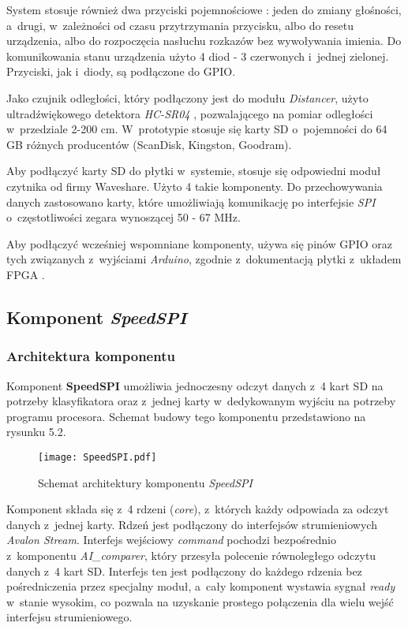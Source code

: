 System stosuje również dwa przyciski pojemnościowe \cite{Button}: jeden do zmiany głośności, a~drugi, w~zależności od czasu przytrzymania przycisku, albo do resetu urządzenia, albo do rozpoczęcia nasłuchu rozkazów bez wywoływania imienia. Do komunikowania stanu urządzenia użyto 4 diod - 3 czerwonych i~jednej zielonej. Przyciski, jak i~diody, są podłączone do GPIO.

Jako czujnik odległości, który podłączony jest do modułu \textit{Distancer}, użyto ultradźwiękowego detektora \textit{HC-SR04} \cite{Distance}, pozwalającego na pomiar odległości w~przedziale 2-200 cm. W~prototypie stosuje się karty SD o~pojemności do 64 GB różnych producentów (ScanDisk, Kingston, Goodram).

Aby podłączyć karty SD do płytki w~systemie, stosuje się odpowiedni moduł czytnika \cite{Shield} od firmy Waveshare. Użyto 4 takie komponenty. Do przechowywania danych zastosowano karty, które umożliwiają komunikację po interfejsie \textit{SPI} o~częstotliwości zegara wynoszącej 50 - 67 MHz.

Aby podłączyć wcześniej wspomniane komponenty, używa się pinów GPIO oraz tych związanych z~wyjściami \textit{Arduino}, zgodnie z~dokumentacją płytki z~układem FPGA \cite{DE10L}.

\subsection{Komponent \textit{SpeedSPI}}
\subsubsection{Architektura komponentu}
Komponent \textbf{SpeedSPI} umożliwia jednoczesny odczyt danych z~4 kart SD na potrzeby klasyfikatora oraz z~jednej karty w~dedykowanym wyjściu na potrzeby programu procesora. Schemat budowy tego komponentu przedstawiono na rysunku 5.2.

\begin{figure}[h]
	\centering
	\texttt{[image: SpeedSPI.pdf]}
	\caption{Schemat architektury komponentu \textit{SpeedSPI}}
\end{figure}
\FloatBarrier %

Komponent składa się z~4 rdzeni (\textit{core}), z~których każdy odpowiada za odczyt danych z~jednej karty. Rdzeń jest podłączony do interfejsów strumieniowych \textit{Avalon Stream}. Interfejs wejściowy \textit{command} pochodzi bezpośrednio z~komponentu \textit{AI\_comparer}, który przesyła polecenie równoległego odczytu danych z~4 kart SD. Interfejs ten jest podłączony do każdego rdzenia bez pośredniczenia przez specjalny moduł, a~cały komponent wystawia sygnał \textit{ready} w~stanie wysokim, co pozwala na uzyskanie prostego połączenia dla wielu wejść interfejsu strumieniowego.

